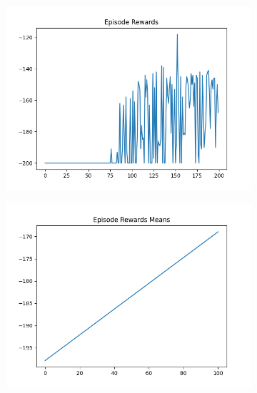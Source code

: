 \begin{figure}[H]
\begin{subfigure}{.47\linewidth}
        \includegraphics[width=\textwidth]{mountain/2024-06-15_13-45-28_dqn_mountaincar_episode_rewards.png}
    \end{subfigure}
    \begin{subfigure}{.47\linewidth}
        \centering
        \includegraphics[width=\textwidth]{mountain/2024-06-15_13-45-28_dqn_mountaincar_episode_rewards_means.png}
    \end{subfigure}
\end{figure}
